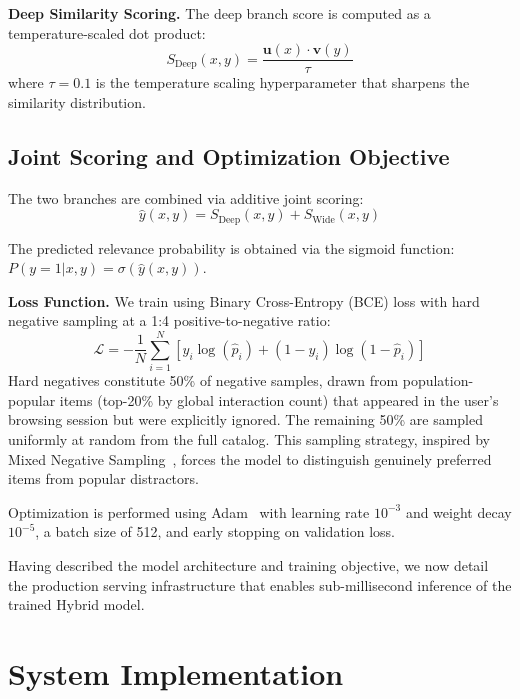 \documentclass[10pt,conference]{IEEEtran}
\begin{document}
\textbf{Deep Similarity Scoring.} The deep branch score is computed as a temperature-scaled dot product:
\begin{equation}
S_{\text{Deep}}(x, y) = \frac{\mathbf{u}(x) \cdot \mathbf{v}(y)}{\tau}
\label{eq:deep_score}
\end{equation}
where $\tau = 0.1$ is the temperature scaling hyperparameter that sharpens the similarity distribution.

\subsection{Joint Scoring and Optimization Objective}
\label{subsec:joint_scoring}

The two branches are combined via additive joint scoring:
\begin{equation}
\hat{y}(x, y) = S_{\text{Deep}}(x, y) + S_{\text{Wide}}(x, y)
\label{eq:joint_logits}
\end{equation}

The predicted relevance probability is obtained via the sigmoid function: $P(y=1|x,y) = \sigma(\hat{y}(x,y))$.

\textbf{Loss Function.} We train using Binary Cross-Entropy (BCE) loss with hard negative sampling at a 1:4 positive-to-negative ratio:
\begin{equation}
\mathcal{L} = -\frac{1}{N} \sum_{i=1}^{N} \left[ y_i \log(\hat{p}_i) + (1 - y_i) \log(1 - \hat{p}_i) \right]
\label{eq:bce_loss}
\end{equation}
Hard negatives constitute 50\% of negative samples, drawn from population-popular items (top-20\% by global interaction count) that appeared in the user's browsing session but were explicitly ignored. The remaining 50\% are sampled uniformly at random from the full catalog. This sampling strategy, inspired by Mixed Negative Sampling~\cite{yang2020mixed}, forces the model to distinguish genuinely preferred items from popular distractors.

Optimization is performed using Adam~\cite{kingma2015adam} with learning rate $10^{-3}$ and weight decay $10^{-5}$, a batch size of 512, and early stopping on validation loss.

Having described the model architecture and training objective, we now detail the production serving infrastructure that enables sub-millisecond inference of the trained Hybrid model.

\section{System Implementation}
\label{sec:implementation}
\end{document}
